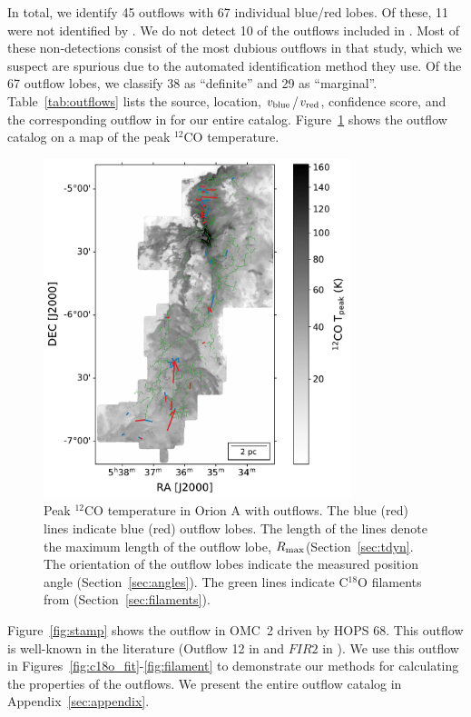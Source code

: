 \documentclass[twocolumn]{aastex63}
\newcommand{\example}{HOPS 68}
\newcommand{\co}[1][]{\ensuremath{^{#1}}CO}
\begin{document}
In total, we identify 45 outflows with 67 individual blue/red lobes. Of these, 11 were not identified by \citet{Tanabe:submitted}. We do not detect 10 of the outflows included in \citet{Tanabe:submitted}. Most of these non-detections consist of the most dubious outflows in that study, which we suspect are spurious due to the automated identification method they use. Of the 67 outflow lobes, we classify 38 as ``definite'' and 29 as ``marginal''. Table~\ref{tab:outflows} lists the source, location, $v_{\rm blue}$/$v_{\rm red}$, confidence score, and the corresponding outflow in \citet{Tanabe:submitted} for our entire catalog. Figure~\ref{fig:overview} shows the outflow catalog on a map of the peak \co[12]{} temperature.

\begin{figure}
\centering
\includegraphics[width=0.8\textwidth]{overview.pdf}
\caption{Peak \co[12]{} temperature in Orion A with outflows. The blue (red) lines indicate blue (red) outflow lobes. The length of the lines denote the maximum length of the outflow lobe, $R_{\rm max}$(Section~\ref{sec:tdyn}. The orientation of the outflow lobes indicate the measured position angle (Section~\ref{sec:angles}). The green lines indicate C$^{18}$O filaments from \citet{Suri19} (Section~\ref{sec:filaments}). \label{fig:overview}}
\end{figure}


Figure~\ref{fig:stamp} shows the outflow in OMC~2 driven by \example{}. This outflow is well-known in the literature (Outflow 12 in \citealp{Tanabe:submitted} and $FIR 2$ in \citealp{Takahashi08}). We use this outflow in Figures~\ref{fig:c18o_fit}-\ref{fig:filament} to demonstrate our methods for calculating the properties of the outflows. We present the entire outflow catalog in Appendix~\ref{sec:appendix}.
\end{document}

